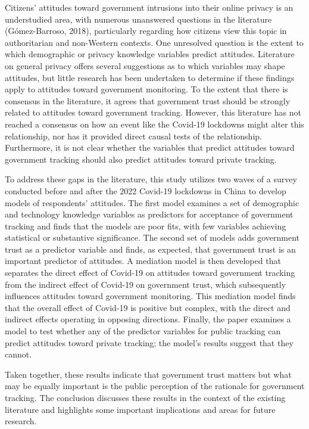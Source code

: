\documentclass[
  letterpaper,
  DIV=11,
  numbers=noendperiod]{scrartcl}
\begin{document}
Citizens' attitudes toward government intrusions into their online
privacy is an understudied area, with numerous unanswered questions in
the literature (Gómez-Barroso, 2018), particularly regarding how
citizens view this topic in authoritarian and non-Western contexts. One
unresolved question is the extent to which demographic or privacy
knowledge variables predict attitudes. Literature on general privacy
offers several suggestions as to which variables may shape attitudes,
but little research has been undertaken to determine if these findings
apply to attitudes toward government monitoring. To the extent that
there is consensus in the literature, it agrees that government trust
should be strongly related to attitudes toward government tracking.
However, this literature has not reached a consensus on how an event
like the Covid-19 lockdowns might alter this relationship, nor has it
provided direct causal tests of the relationship. Furthermore, it is not
clear whether the variables that predict attitudes toward government
tracking should also predict attitudes toward private tracking.

To address these gaps in the literature, this study utilizes two waves
of a survey conducted before and after the 2022 Covid-19 lockdowns in
China to develop models of respondents' attitudes. The first model
examines a set of demographic and technology knowledge variables as
predictors for acceptance of government tracking and finds that the
models are poor fits, with few variables achieving statistical or
substantive significance. The second set of models adds government trust
as a predictor variable and finds, as expected, that government trust is
an important predictor of attitudes. A mediation model is then developed
that separates the direct effect of Covid-19 on attitudes toward
government tracking from the indirect effect of Covid-19 on government
trust, which subsequently influences attitudes toward government
monitoring. This mediation model finds that the overall effect of
Covid-19 is positive but complex, with the direct and indirect effects
operating in opposing directions. Finally, the paper examines a model to
test whether any of the predictor variables for public tracking can
predict attitudes toward private tracking; the model's results suggest
that they cannot.

Taken together, these results indicate that government trust matters but
what may be equally important is the public perception of the rationale
for government tracking. The conclusion discusses these results in the
context of the existing literature and highlights some important
implications and areas for future research.
\end{document}
